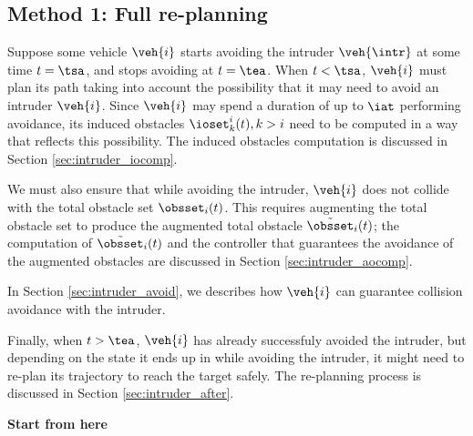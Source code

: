 \subsection{Method 1: Full re-planning \label{sec:intruder_method1}}

Suppose some vehicle $\veh{i}$ starts avoiding the intruder $\veh{\intr}$ at some time $t = \tsa$, and stops avoiding at $t = \tea$. When $t < \tsa$, $\veh{i}$ must plan its path taking into account the possibility that it may need to avoid an intruder $\veh{i}$. Since $\veh{i}$ may spend a duration of up to $\iat$ performing avoidance, its induced obstacles $\ioset_k^i(t), k>i$ need to be computed in a way that reflects this possibility. The induced obstacles computation is discussed in Section \ref{sec:intruder_iocomp}.

We must also ensure that while avoiding the intruder, $\veh{i}$ does not collide with the total obstacle set $\obsset_i(t)$. This requires augmenting the total obstacle set to produce the augmented total obstacle $\tilde\obsset_i(t)$; the computation of $\tilde\obsset_i(t)$ and the controller that guarantees the avoidance of the augmented obstacles are discussed in Section \ref{sec:intruder_aocomp}.

In Section \ref{sec:intruder_avoid}, we describes how $\veh{i}$ can guarantee collision avoidance with the intruder.

Finally, when $t > \tea$, $\veh{i}$ has already successfuly avoided the intruder, but depending on the state it ends up in while avoiding the intruder, it might need to re-plan its trajectory to reach the target safely. The re-planning process is discussed in Section \ref{sec:intruder_after}.


\textbf{Start from here}

